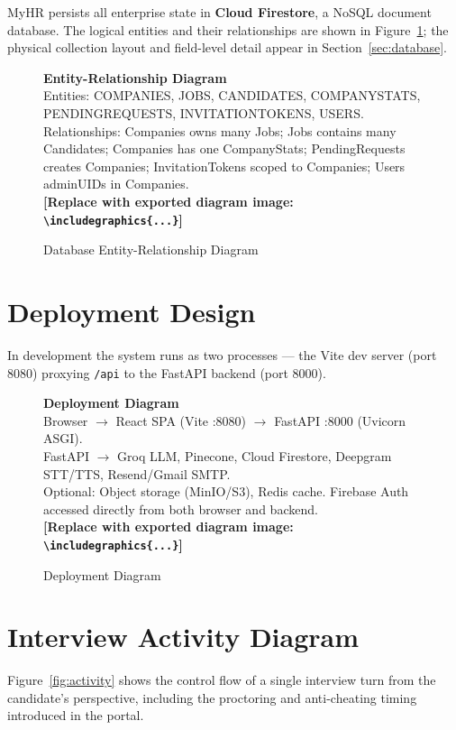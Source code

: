 \documentclass[12pt,a4paper,oneside]{report}
\newcommand{\diagramplaceholder}[1]{%
  \begin{tcolorbox}[
    colback=gray!5, colframe=gray!50,
    boxrule=0.4pt, arc=2pt,
    left=10pt, right=10pt, top=8pt, bottom=8pt,
    fontupper=\small\itshape
  ]
  \centering #1\\[4pt]
  \textbf{[Replace with exported diagram image: \texttt{\textbackslash includegraphics\{...\}}]}
  \end{tcolorbox}%
}
\begin{document}
MyHR persists all enterprise state in \textbf{Cloud Firestore}, a NoSQL document database.
The logical entities and their relationships are shown in Figure~\ref{fig:er}; the physical
collection layout and field-level detail appear in Section~\ref{sec:database}.

\begin{figure}[H]
\centering
\diagramplaceholder{%
  \textbf{Entity-Relationship Diagram}\\
  Entities: COMPANIES, JOBS, CANDIDATES, COMPANYSTATS, PENDINGREQUESTS, INVITATIONTOKENS, USERS.\\
  Relationships: Companies owns many Jobs; Jobs contains many Candidates; Companies has one CompanyStats;
  PendingRequests creates Companies; InvitationTokens scoped to Companies; Users adminUIDs in Companies.%
}
\caption{Database Entity-Relationship Diagram}
\label{fig:er}
\end{figure}

\section{Deployment Design}

In development the system runs as two processes --- the Vite dev server (port 8080) proxying
\texttt{/api} to the FastAPI backend (port 8000).

\begin{figure}[H]
\centering
\diagramplaceholder{%
  \textbf{Deployment Diagram}\\
  Browser $\to$ React SPA (Vite :8080) $\to$ FastAPI :8000 (Uvicorn ASGI).\\
  FastAPI $\to$ Groq LLM, Pinecone, Cloud Firestore, Deepgram STT/TTS, Resend/Gmail SMTP.\\
  Optional: Object storage (MinIO/S3), Redis cache.
  Firebase Auth accessed directly from both browser and backend.%
}
\caption{Deployment Diagram}
\label{fig:deploy}
\end{figure}

\section{Interview Activity Diagram}

Figure~\ref{fig:activity} shows the control flow of a single interview turn from the
candidate's perspective, including the proctoring and anti-cheating timing introduced in the
portal.
\end{document}

